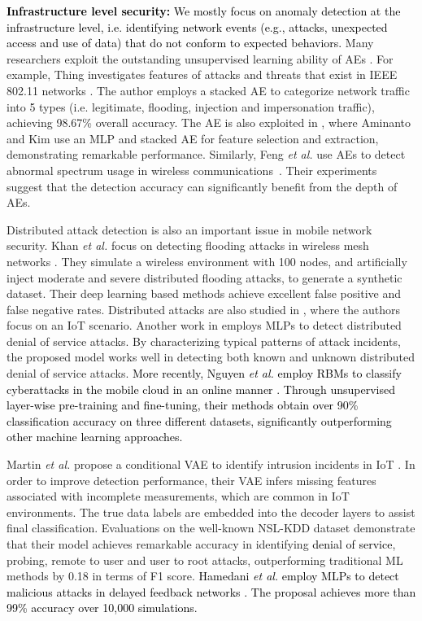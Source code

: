 \documentclass[journal,comsoc,letter]{IEEEtran}
\newcommand{\edit}[1]{\textcolor{black}{#1}}
\newcommand{\rev}[1]{\textcolor{black}{#1}}
\begin{document}
\noindent\edit{\textbf{Infrastructure level security:} We mostly focus on anomaly detection at the infrastructure level, i.e. identifying network events (e.g., attacks, unexpected access and use of data) that do not conform to expected behaviors.} Many researchers exploit the outstanding unsupervised learning ability of AEs \cite{yousefi2017autoencoder}. For example, Thing investigates features of attacks and threats that exist in IEEE 802.11 networks \cite{thing2017ieee}. The author employs a stacked AE to categorize network traffic into 5 types (i.e. legitimate, flooding, injection and impersonation traffic), achieving 98.67\% overall accuracy. The AE is also exploited in \cite{aminanto2016detecting}, where Aminanto and Kim use an MLP and stacked AE for feature selection and extraction, demonstrating remarkable performance. Similarly, Feng \emph{et al.} use AEs to detect abnormal spectrum usage in wireless communications~\cite{feng2016anomaly}. Their experiments suggest that the detection accuracy can significantly benefit from the depth of AEs.

Distributed attack detection is also an important issue in mobile network security. Khan \emph{et al.} focus on detecting flooding attacks in wireless mesh networks \cite{khan2016distributed}. They simulate a wireless environment with 100 nodes, and artificially inject moderate and severe distributed flooding attacks, to generate a synthetic dataset. Their deep learning based methods achieve excellent false positive and false negative rates. Distributed attacks are also studied in \cite{diro2017distributed}, where the authors focus on an IoT scenario. Another work in \cite{saied2016detection} employs MLPs to detect distributed denial of service attacks. By characterizing typical patterns of attack incidents, the proposed model works well in detecting both known and unknown distributed denial of service attacks. \rev{More recently, Nguyen \emph{et al.} employ RBMs to classify cyberattacks in the mobile cloud in an online manner \cite{nguyen2018cyberattack}. Through unsupervised layer-wise pre-training and fine-tuning, their methods obtain over 90\% classification accuracy on three different datasets, significantly outperforming other machine learning approaches.}

Martin \emph{et al.} propose a conditional VAE to identify intrusion incidents in IoT \cite{lopez2017conditional}. In order to improve detection performance, their VAE infers missing features associated with incomplete measurements, which are common in IoT environments. The true data labels are embedded into the decoder layers to assist final classification. Evaluations on the well-known NSL-KDD dataset \cite{tavallaee2009detailed} demonstrate that their model achieves remarkable accuracy in identifying \edit{denial of service}, probing, remote to user and user to root attacks, outperforming traditional ML methods by 0.18 in terms of F1 score. \edit{Hamedani \emph{et al.} employ MLPs to detect malicious attacks in delayed feedback networks \cite{hamedani2018reservoir}. The proposal achieves more than 99\% accuracy over 10,000 simulations.}\\
\end{document}
